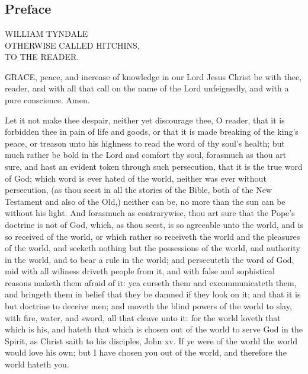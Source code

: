 \section*{}

\begin{abstract}
\end{abstract}

\subsection*{Preface}
\begin{center}
WILLIAM TYNDALE\\
OTHERWISE CALLED HITCHINS,\\
TO THE READER. 
\end{center}

GRACE, peace, and increase of knowledge in 
our Lord Jesus Christ be with thee, reader, 
and with all that call on the name of the Lord 
unfeignedly, and with a pure conscience. Amen. 

Let it not make thee despair, neither yet discourage
thee, O reader, that it is forbidden thee 
in pain of life and goods, or that it is made 
breaking of the king's peace, or treason unto his
highness to read the word of thy soul's health;
but much rather be bold in the Lord and comfort
thy soul, forasmuch as thou art sure, and hast an 
evident token through such persecution, that it is 
the true word of God; which word is ever hated 
of the world, neither was ever without persecution,
(as thou seest in all the stories of the 
Bible, both of the New Testament and also of the 
Old,) neither can be, no more than the sun can be
without his light. And forasmuch as contrarywise,
thou art sure that the Pope's doctrine is
not of God, which, as thou seest, is so agreeable 
unto the world, and is so received of the world, 
or which rather so receiveth the world and the 
pleasures of the world, and seeketh nothing but 
the possessions of the world, and authority in the 
world, and to bear a rule in the world; and persecuteth
the word of God, mid with all wiliness 
driveth people from it, and with false and sophistical
reasons maketh them afraid of it: yea curseth 
them and excommunicateth them, and bringeth 
them in belief that they be damned if they look 
on it; and that it is but doctrine to deceive men; 
and moveth the blind powers of the world to 
slay, with fire, water, and sword, all that cleave 
unto it: for the world loveth that which is his, 
and hateth that which is chosen out of the world 
to serve God in the Spirit, as Christ saith to his 
disciples, John xv. If ye were of the world the 
world would love his own; but I have chosen you 
out of the world, and therefore the world hateth 
you. 

